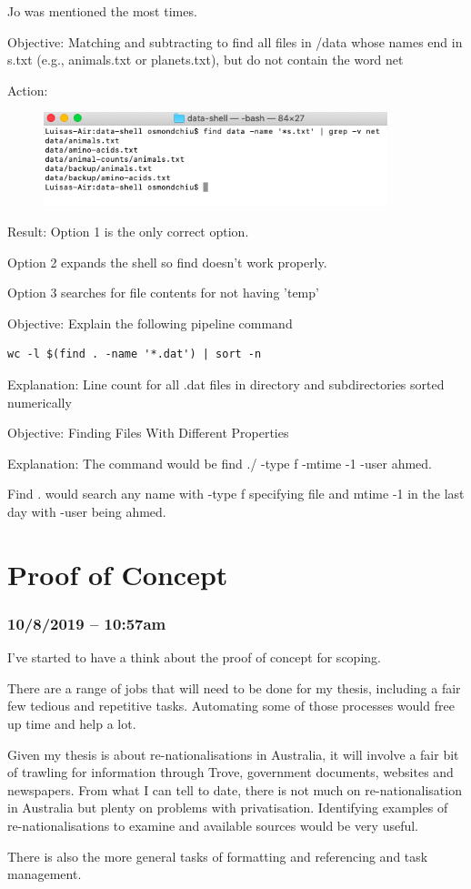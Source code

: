 \documentclass{article}
\begin{document}
Jo was mentioned the most times.

Objective: Matching and subtracting to find all files in /data whose names end in s.txt (e.g., animals.txt or planets.txt), but do not contain the word net

Action:

\begin{figure}[htp]
    \centering
    \includegraphics[width=10cm]{Screenshot25.png}
    \label{fig:ls-25}
\end{figure}

Result: Option 1 is the only correct option.

Option 2 expands the shell so find doesn't work properly.

Option 3 searches for file contents for not having 'temp'


Objective: Explain the following pipeline command

\begin{verbatim}
wc -l $(find . -name '*.dat') | sort -n    
\end{verbatim}

Explanation: Line count for all .dat files in directory and subdirectories sorted numerically


Objective: Finding Files With Different Properties

Explanation: The command would be find ./ -type f -mtime -1 -user ahmed.

Find . would search any name with -type f specifying file and mtime -1 in the last day with -user being ahmed.


\newpage

\section{Proof of Concept}
\subsubsection*{10/8/2019 – 10:57am}
I’ve started to have a think about the proof of concept for scoping.\par
There are a range of jobs that will need to be done for my thesis, including a fair few tedious and repetitive tasks. Automating some of those processes would free up time and help a lot.\par
Given my thesis is about re-nationalisations in Australia, it will involve a fair bit of trawling for information through Trove, government documents, websites and newspapers. From what I can tell to date, there is not much on re-nationalisation in Australia but plenty on problems with privatisation. Identifying examples of re-nationalisations to examine and available sources would be very useful.\par
There is also the more general tasks of formatting and referencing and task management.
\end{document}
